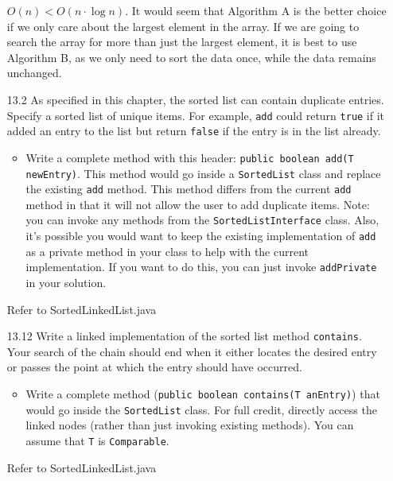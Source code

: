 \documentclass[10pt]{article}
\begin{document}
\begin{enumerate}
				\vspace{0.5cm}
				$O(n) < O(n \cdot \log n)$. It would seem that Algorithm A is the better choice if we only care about the largest element in the array. If we are going to search the array for more than just the largest element, it is best to use Algorithm B, as we only need to sort the data once, while the data remains unchanged.
			
			\item[13.2] As specified in this chapter, the sorted list can contain duplicate entries. Specify a sorted list of unique items. For example, \texttt{add} could return \texttt{true} if it added an entry to the list but return \texttt{false} if the entry is in the list already.
				\begin{itemize}
					\item Write a complete method with this header: \texttt{public boolean add(T newEntry)}. This method would go inside a \texttt{SortedList} class and replace the existing \texttt{add} method. This method differs from the current \texttt{add} method in that it will not allow the user to add duplicate items. Note: you can invoke any methods from the \texttt{SortedListInterface} class. Also, it's possible you would want to keep the existing implementation of \texttt{add} as a private method in your class to help with the current implementation. If you want to do this, you can just invoke \texttt{addPrivate} in your solution.
				\end{itemize}
				
				\vspace{0.5cm}
				Refer to SortedLinkedList.java
				\vspace{0.5cm}
			
			\item[13.12] Write a linked implementation of the sorted list method \texttt{contains}. Your search of the chain should end when it either locates the desired entry or passes the point at which the entry should have occurred.
				\begin{itemize}
					\item Write a complete method (\texttt{public boolean contains(T anEntry)}) that would go inside the \texttt{SortedList} class. For full credit, directly access the linked nodes (rather than just invoking existing methods). You can assume that \texttt{T} is \texttt{Comparable}.
				\end{itemize}
				
				\vspace{0.5cm}
				Refer to SortedLinkedList.java
		\end{enumerate}
		
\end{document}
